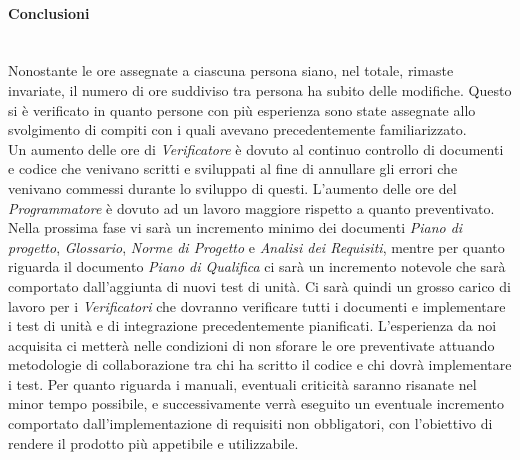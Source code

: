 \paragraph{Conclusioni} ~\\
Nonostante le ore assegnate a ciascuna persona siano, nel totale, rimaste invariate, il numero di ore suddiviso tra persona ha subito delle modifiche. Questo si è verificato in quanto persone con più esperienza sono state assegnate allo svolgimento di compiti con i quali avevano precedentemente familiarizzato. \\
Un aumento delle ore di \textit{Verificatore} è dovuto al continuo controllo di documenti e codice che venivano scritti e sviluppati al fine di annullare gli errori che venivano commessi durante lo sviluppo di questi. L'aumento delle ore del \textit{Programmatore} è dovuto ad un lavoro maggiore rispetto a quanto preventivato. \\
Nella prossima fase vi sarà un incremento minimo dei documenti \textit{Piano di progetto}, \textit{Glossario}, \textit{Norme di Progetto} e \textit{Analisi dei Requisiti}, mentre per quanto riguarda il documento \textit{Piano di Qualifica} ci sarà un incremento notevole che sarà comportato dall'aggiunta di nuovi test di unità. Ci sarà quindi un grosso carico di lavoro per i \textit{Verificatori} che dovranno verificare tutti i documenti e implementare i test di unità e di integrazione precedentemente pianificati. L'esperienza da noi acquisita ci metterà nelle condizioni di non sforare le ore preventivate attuando metodologie di collaborazione tra chi ha scritto il codice e chi dovrà implementare i test. Per quanto riguarda i manuali, eventuali criticità saranno risanate nel minor tempo possibile, e successivamente verrà eseguito un eventuale incremento comportato dall'implementazione di requisiti non obbligatori, con l'obiettivo di rendere il prodotto più appetibile e utilizzabile.\\




